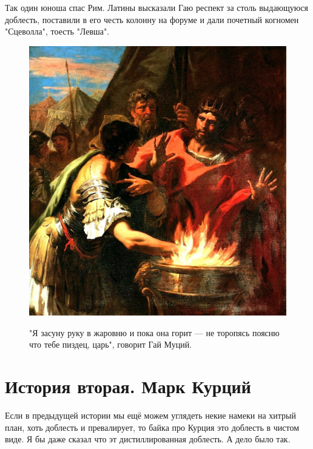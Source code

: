 Так один юноша спас Рим. Латины высказали Гаю респект за столь выдающуюся доблесть, поставили в его честь колонну на форуме и дали почетный когномен "Сцеволла", тоесть "Левша". 
\begin{figure}[h!tb]
	\centering\includegraphics[scale=0.4]{Two_coolstories/1602147758127056135.png}
	\label{fig:coolst1} %
	\caption{"Я засуну руку в жаровню и пока она горит — не торопясь поясню что тебе пиздец, царь", говорит Гай Муций.	}
\end{figure}

\section{История вторая. Марк Курций}

Если в предыдущей истории мы ещё можем углядеть некие намеки на хитрый план, хоть доблесть и превалирует, то байка про Курция это доблесть в чистом виде. Я бы даже сказал что эт дистиллированная доблесть. А дело было так.


